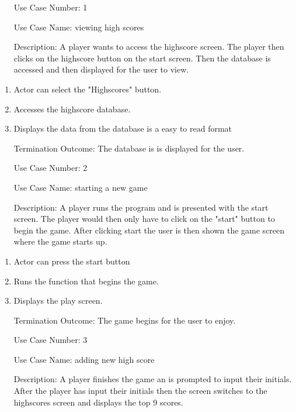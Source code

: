 \documentclass[10pt,conference,onecolumn,compsoc]{IEEEtran}
\begin{document}
\begin{itemize}
\item[Use Case Number:] 1
\item[Use Case Name:] viewing high scores
\item[Description:] A player wants to access the highscore screen. The player then clicks on the highscore button on the start screen. Then the database is accessed and then displayed for the user to view.
\end{itemize}

\begin{enumerate}
\item Actor can select the "Highscores" button.
\item Accesses the highscore database.
\item Displays the data from the database is a easy to read format
\item[Termination Outcome:] The database is is displayed for the user.
\end{enumerate}

\begin{itemize}
\item[Use Case Number:] 2
\item[Use Case Name:] starting a new game
\item[Description:] A player runs the program and is presented with the start screen. The player would then only have to click on the "start" button to begin the game. After clicking start the user is then shown the game screen where the game starts up.
\end{itemize}

\begin{enumerate}
\item Actor can press the start button
\item Runs the function that begins the game.
\item Displays the play screen.
\item[Termination Outcome:] The game begins for the user to enjoy.
\end{enumerate}

\begin{itemize}
\item[Use Case Number:] 3
\item[Use Case Name:] adding new high score
\item[Description:] A player finishes the game an is prompted to input their initials. After the player has input their initials then the screen switches to the highscores screen and displays the top 9 scores.
\end{itemize}
\end{document}
